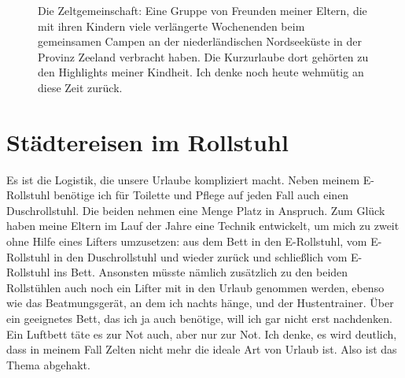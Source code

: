 \documentclass[fontsize=14pt,a4paper,headinclude,DIV=calc,automark]{scrbook}
\begin{document}
\setlength{\fboxsep}{0pt}    %
\setlength{\fboxrule}{0.2pt} %
\begin{figure}[H]
    \raggedright
    \caption{Die Zeltgemeinschaft: Eine Gruppe von Freunden meiner Eltern, die mit ihren Kindern viele verlängerte Wochenenden beim gemeinsamen Campen an der niederländischen Nordseeküste in der Provinz Zeeland verbracht haben. Die Kurzurlaube dort gehörten zu den Highlights meiner Kindheit. Ich denke noch heute wehmütig an diese Zeit zurück.}
    \label{fig:zeltgemeinschaftcollection}
\end{figure}

\section{Städtereisen im Rollstuhl}

Es ist die Logistik, die unsere Urlaube kompliziert macht. Neben meinem E-Rollstuhl benötige ich für Toilette und Pflege auf jeden Fall auch einen Duschrollstuhl. Die beiden nehmen eine Menge Platz in Anspruch. Zum Glück haben meine Eltern im Lauf der Jahre eine Technik entwickelt, um mich zu zweit ohne Hilfe eines Lifters umzusetzen: aus dem Bett in den E-Rollstuhl, vom E-Rollstuhl in den Duschrollstuhl und wieder zurück und schließlich vom E-Rollstuhl ins Bett. Ansonsten müsste nämlich zusätzlich zu den beiden Rollstühlen auch noch ein Lifter mit in den Urlaub genommen werden, ebenso wie das Beatmungsgerät, an dem ich nachts hänge, und der Hustentrainer. Über ein geeignetes Bett, das ich ja auch benötige, will ich gar nicht erst nachdenken. Ein Luftbett täte es zur Not auch, aber nur zur Not. Ich denke, es wird deutlich, dass in meinem Fall Zelten nicht mehr die ideale Art von Urlaub ist. Also ist das Thema abgehakt. 
\end{document}
